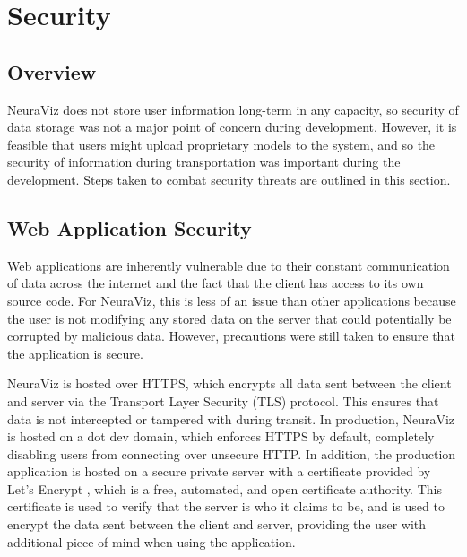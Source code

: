 \section{Security}																	
\label{sec:Security}

\subsection{Overview} 
NeuraViz does not store user information long-term in any capacity, so security of data storage was not a major point of concern during development. However, it is feasible that users might upload proprietary models to the system, and so the security of information during transportation was important during the development. Steps taken to combat security threats are outlined in this section.

\subsection{Web Application Security}
Web applications are inherently vulnerable due to their constant communication of data across the internet and the fact that the client has access to its own source code. For NeuraViz, this is less of an issue than other applications because the user is not modifying any stored data on the server that could potentially be corrupted by malicious data. However, precautions were still taken to ensure that the application is secure.

NeuraViz is hosted over HTTPS, which encrypts all data sent between the client and server via the Transport Layer Security (TLS) protocol. This ensures that data is not intercepted or tampered with during transit. In production, NeuraViz is hosted on a dot dev domain, which enforces HTTPS by default, completely disabling users from connecting over unsecure HTTP. In addition, the production application is hosted on a secure private server with a certificate provided by Let's Encrypt \cite{letsencrypt}, which is a free, automated, and open certificate authority. This certificate is used to verify that the server is who it claims to be, and is used to encrypt the data sent between the client and server, providing the user with additional piece of mind when using the application.

